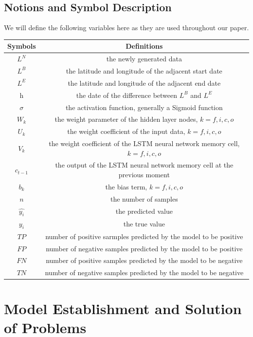 \documentclass{mcmthesis}
\begin{document}
\subsection{Notions and Symbol Description}
We will define the following variables here as they are used throughout our paper.
\begin{table}[H]
\centering
	\begin{tabular}{cc}
		\toprule[1.5pt]
		Symbols& Definitions\\
		\midrule[1pt]
		$ L^N $ & the newly generated data\\
		$ L^B $ & the latitude and longitude of the adjacent start date\\ 
		$ L^E $ & the latitude and longitude of the adjacent end date\\
		h & the date of the difference between $ L^B $ and $ L^E $\\
		$ \sigma $ & the activation function, generally a Sigmoid function\\
		$ W_k$ &  the weight parameter of the hidden layer nodes, $ k=f,i,c,o $\\
		$ U_k$ & the weight coefficient of the input data, $ k=f,i,c,o $\\
		$ V_k$ & the weight coefficient of the LSTM neural network memory cell, $ k=f,i,c,o $\\
		$ c_{t-1} $ &  the output of the LSTM neural network memory cell at the previous moment\\
		$ b_k$ & the bias term, $ k=f,i,c,o $\\
		$ n $ &  the number of samples\\
		$ \hat{y_i} $ & the predicted value\\
		$ y_i $ & the true value \\
		$ TP $ & number of positive sarmples predicted by the model to be positive\\
		$ FP $ & number of negative samples predicted by the model to be positive\\
		$ FN $ & number of positive samples predicted by the model to be negative\\
		$ TN $ & number of negative samples predicted by the model to be negative\\
		\bottomrule[1.5pt]
	\end{tabular}
\end{table}

\section{Model Establishment and Solution of Problems}%
\end{document}

